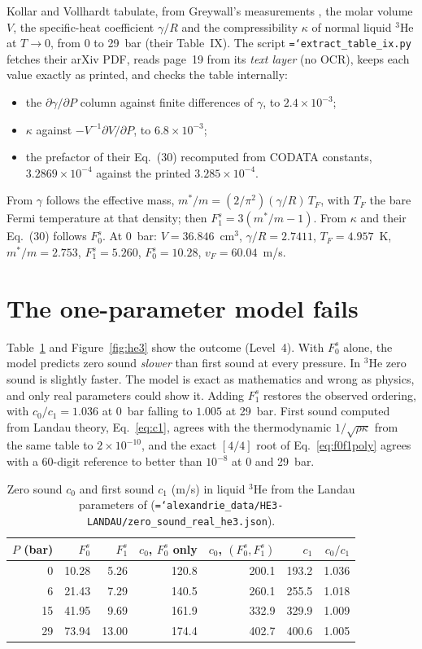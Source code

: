 \documentclass[11pt,a4paper,openany]{book}
\newcommand{\Fzs}{F_0^{s}}
\newcommand{\Fos}{F_1^{s}}
\newcommand{\code}[1]{\texttt{\hyphenchar\font=`\-\relax #1}}
\theoremstyle{definition}
\theoremstyle{plain}
\begin{document}
Kollar and Vollhardt \cite{kollar2000} tabulate, from Greywall's measurements \cite{greywall1983},
the molar volume $V$, the specific-heat coefficient $\gamma/R$ and the compressibility $\kappa$
of normal liquid $^3$He at $T\to0$, from 0 to 29~bar (their Table~IX). The script
\code{extract\_table\_ix.py} fetches their arXiv PDF, reads page~19 from its \emph{text layer}
(no OCR), keeps each value exactly as printed, and checks the table internally:
\begin{itemize}
  \item the $\partial\gamma/\partial P$ column against finite differences of $\gamma$, to
        $2.4\times10^{-3}$;
  \item $\kappa$ against $-V^{-1}\partial V/\partial P$, to $6.8\times10^{-3}$;
  \item the prefactor of their Eq.~(30) recomputed from CODATA constants, $3.2869\times10^{-4}$
        against the printed $3.285\times10^{-4}$.
\end{itemize}
From $\gamma$ follows the effective mass, $m^*/m=(2/\pi^2)(\gamma/R)\,T_F$, with $T_F$ the bare
Fermi temperature at that density; then $\Fos=3(m^*/m-1)$. From $\kappa$ and their Eq.~(30)
follows $\Fzs$. At 0~bar: $V=36.846$~cm$^3$, $\gamma/R=2.7411$, $T_F=4.957$~K, $m^*/m=2.753$,
$\Fos=5.260$, $\Fzs=10.28$, $v_F=60.04$~m/s.

\section{The one-parameter model fails}

Table~\ref{tab:he3} and Figure~\ref{fig:he3} show the outcome (Level~4). With $\Fzs$ alone, the
model predicts zero sound \emph{slower} than first sound at every pressure. In $^3$He zero sound
is slightly faster. The model is exact as mathematics and wrong as physics, and only real
parameters could show it. Adding $\Fos$ restores the observed ordering, with $c_0/c_1=1.036$ at
0~bar falling to $1.005$ at 29~bar. First sound computed from Landau theory, Eq.~\eqref{eq:c1},
agrees with the thermodynamic $1/\sqrt{\rho\kappa}$ from the same table to $2\times10^{-10}$, and
the exact $[4/4]$ root of Eq.~\eqref{eq:f0f1poly} agrees with a 60-digit reference to better than
$10^{-8}$ at 0 and 29~bar.

\begin{table}[htbp]
\centering
\caption{Zero sound $c_0$ and first sound $c_1$ (m/s) in liquid $^3$He from the Landau parameters
of \cite{kollar2000} (\code{alexandrie\_data/HE3-LANDAU/zero\_sound\_real\_he3.json}).}
\label{tab:he3}
\begin{tabular}{rrrrrrr}
\toprule
$P$ (bar) & $\Fzs$ & $\Fos$ & $c_0$, $\Fzs$ only & $c_0$, $(\Fzs,\Fos)$ & $c_1$ & $c_0/c_1$ \\
\midrule
0  & 10.28 & 5.26  & 120.8 & 200.1 & 193.2 & 1.036 \\
6  & 21.43 & 7.29  & 140.5 & 260.1 & 255.5 & 1.018 \\
15 & 41.95 & 9.69  & 161.9 & 332.9 & 329.9 & 1.009 \\
29 & 73.94 & 13.00 & 174.4 & 402.7 & 400.6 & 1.005 \\
\bottomrule
\end{tabular}
\end{table}
\end{document}
